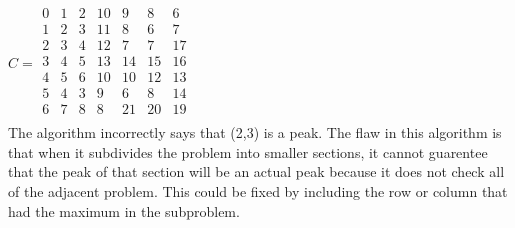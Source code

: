 \documentclass[12pt,twoside]{article}
\begin{document}
\begin{problems}
\begin{problemparts}
$C = \begin{array}{ccccccc}
0 & 1&2&10&9&8&6 \\
1&2&3&11&8&6&7 \\
2&3&4&12&7&7&17\\
3&4&5&13&14&15&16\\
4&5&6&10&10&12&13\\
5&4&3&9&6&8&14\\
6&7&8&8&21&20&19\\
\end{array}$
\\
The algorithm incorrectly says that (2,3) is a peak.  The flaw in this algorithm is that when it subdivides the problem into smaller sections, it cannot guarentee that the peak of that section will be an actual peak because it does not check all of the adjacent problem.  This could be fixed by including the row or column that had the maximum in the subproblem.\\


\end{problemparts}
\end{problems}
\end{document}
